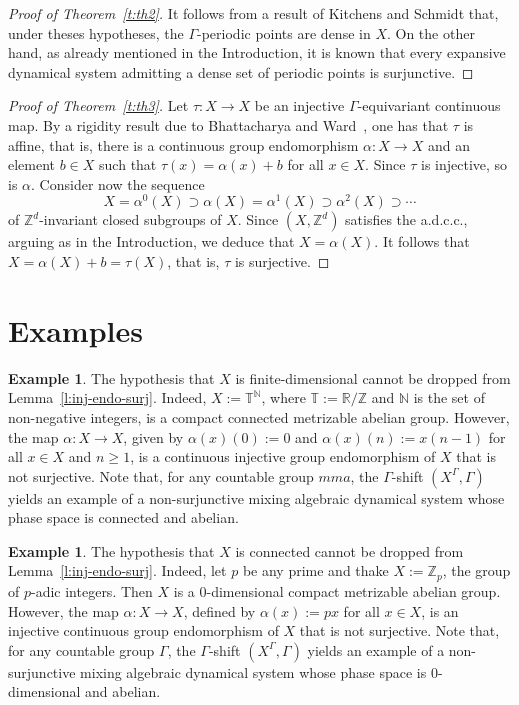 \documentclass[12pt,a4paper]{amsart}
\theoremstyle{definition}
\newtheorem{example}[theorem]{Example}
\numberwithin{equation}{section}
\begin{document}
\begin{proof}[Proof of Theorem~\ref{t:th2}]
It follows from a result of Kitchens and Schmidt
\cite[Corollary~7.4]{kitchens-schmidt-1989} that, under theses hypotheses, the $\Gamma$-periodic points are dense in $X$.
On the other hand, as already mentioned in the Introduction,  it is known 
\cite[Proposition~5.1]{csc-ijm-2015} that every expansive dynamical system 
admitting a dense set of periodic points is surjunctive. 
\end{proof}

\begin{proof}[Proof of Theorem~\ref{t:th3}]
Let $\tau \colon X \to X$ be an injective   $\Gamma$-equivariant continuous map.
By a rigidity result due to Bhattacharya and Ward~\cite[Theorem~1.1]{bhattacharya-ward},
one has that $\tau$ is affine, that is, there is a continuous group endomorphism $\alpha \colon X \to X$ and an element
$b \in X$ such that  $\tau(x) = \alpha(x) + b$ for all $x \in X$. Since $\tau$ is injective, so is $\alpha$.
Consider now the sequence
\[
X = \alpha^0(X) \supset \alpha(X) = \alpha^1(X) \supset \alpha^2(X) \supset \cdots
\]
of ${\mathbb{Z}}^d$-invariant closed subgroups of $X$. 
Since $(X,{\mathbb{Z}}^d)$ satisfies the a.d.c.c., arguing as in the Introduction, we deduce that $X = \alpha(X)$.
It follows that $X = \alpha(X)+b = \tau(X)$, that is, $\tau$ is surjective.
\end{proof}

\section{Examples}

  \begin{example}
  The hypothesis that $X$ is finite-dimensional cannot be dropped from Lemma~\ref{l:inj-endo-surj}.
  Indeed,  $X := {\mathbb{T}}^{\mathbb{N}}$, where ${\mathbb{T}} := {\mathbb{R}}/{\mathbb{Z}}$ and ${\mathbb{N}}$ is the set of non-negative integers, is  a compact connected metrizable abelian group.
  However, the map $\alpha \colon X \to X$, given by
$\alpha(x)(0) := 0$ and $  \alpha(x)(n) := x(n - 1)$  for all $x \in X$ and $n \geq 1$,
   is a continuous injective group endomorphism of $X$ that is not surjective.
   Note that, for any countable group $mma$,  the $\Gamma$-shift $(X^\Gamma,\Gamma)$ yields an example of a non-surjunctive mixing algebraic dynamical system whose phase space 
is connected and abelian.
  \end{example}
  
 \begin{example}
    The hypothesis that $X$ is connected cannot be dropped from Lemma~\ref{l:inj-endo-surj}.
    Indeed, let $p$ be any prime and  thake $X := {\mathbb{Z}}_p$, the group of $p$-adic integers.
Then $X$ is a $0$-dimensional compact metrizable abelian group.    
However, the map $\alpha \colon X \to X$, defined by  $\alpha(x) := p x$ for all $x \in X$, is an injective continuous group endomorphism of $X$ that is not surjective.
Note that, for any countable group $\Gamma$,  the $\Gamma$-shift $(X^\Gamma,\Gamma)$ yields an example of a non-surjunctive mixing algebraic dynamical system whose phase space 
is $0$-dimensional and abelian.
\end{example}
\end{document}

